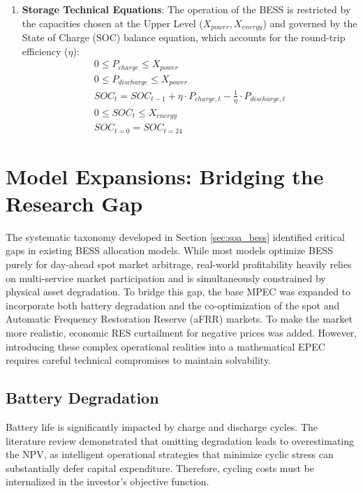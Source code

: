 \begin{enumerate}
    \item \textbf{Storage Technical Equations}: The operation of the BESS is restricted by the capacities chosen at the Upper Level (\(X_{power},X_{energy}\)) and governed by the State of Charge (SOC) balance equation, which accounts for the round-trip efficiency (\(\eta\)):
    \begin{equation}
        \begin{split}
            0 \le P_{charge} \le X_{power} \\
            0 \le P_{discharge} \le X_{power} \\
            SOC_{t} = SOC_{t-1} + \eta \cdot P_{charge,t} - \frac{1}{\eta} \cdot P_{discharge,t} \\
            0 \le SOC_{t} \le X_{energy} \\
            SOC_{t=0} = SOC_{t=24}
        \end{split}
    \end{equation}
    
    \end{enumerate}

\section{Model Expansions: Bridging the Research Gap} \label{sect:Model_Expansions}
The systematic taxonomy developed in Section \ref{sec:soa_bess} identified critical gaps in existing BESS allocation models. While most models optimize BESS purely for day-ahead spot market arbitrage, real-world profitability heavily relies on multi-service market participation and is simultaneously constrained by physical asset degradation. To bridge this gap, the base MPEC was expanded to incorporate both battery degradation and the co-optimization of the spot and Automatic Frequency Restoration Reserve (aFRR) markets. To make the market more realistic, economic RES curtailment for negative prices was added.
However, introducing these complex operational realities into a mathematical EPEC requires careful technical compromises to maintain solvability.
\subsection{Battery Degradation}\label{subsect:Battery_Degradation}
Battery life is significantly impacted by charge and discharge cycles. The literature review demonstrated that omitting degradation leads to overestimating the NPV, as intelligent operational strategies that minimize cyclic stress can substantially defer capital expenditure. Therefore, cycling costs must be internalized in the investor's objective function.

